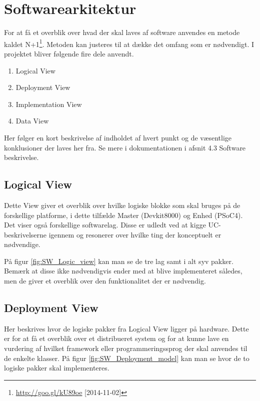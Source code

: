 \section{Softwarearkitektur}

For at få et overblik over hvad der skal laves af software anvendes en metode kaldet N+1\footnote{\url{http://goo.gl/kU89oe} [2014-11-02]}. Metoden kan justeres til at dække det omfang som er nødvendigt. I projektet bliver følgende fire dele anvendt.

\begin{enumerate}
	\item Logical View
	\item Deployment View
	\item Implementation View
	\item Data View
\end{enumerate}

Her følger en kort beskrivelse af indholdet af hvert punkt og de væsentlige konklusioner der laves her fra. Se mere i dokumentationen i afsnit 4.3 Software beskrivelse.

\subsection{Logical View}
Dette View giver et overblik over hvilke logiske blokke som skal bruges på de forskellige platforme, i dette tilfælde Master (Devkit8000) og Enhed (PSoC4). Det viser også forskellige softwarelag. Disse er udledt ved at kigge UC-beskrivelserne igennem og resonerer over hvilke ting der konceptuelt er nødvendige.

På figur \ref{fig:SW_Logic_view} kan man se de tre lag samt i alt syv pakker. Bemærk at disse ikke nødvendigvis ender med at blive implementeret således, men de giver et overblik over den funktionalitet der er nødvendig.


\subsection{Deployment View}
Her beskrives hvor de logiske pakker fra Logical View ligger på hardware. Dette er for at få et overblik over et distribueret system og for at kunne lave en vurdering af hvilket framework eller programmeringssprog der skal anvendes til de enkelte klasser. På figur \ref{fig:SW_Deployment_model} kan man se hvor de to logiske pakker skal implementeres.

